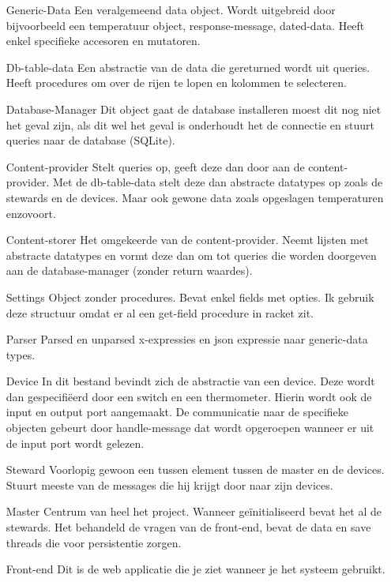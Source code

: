 \documentclass{article}
\begin{document}
\begin{itemize}
\item[Generic-Data] Een veralgemeend data object. Wordt uitgebreid door bijvoorbeeld een temperatuur object, response-message, dated-data. Heeft enkel specifieke accesoren en mutatoren.
\item[Db-table-data] Een abstractie van de data die gereturned wordt uit queries. Heeft procedures om over de rijen te lopen en kolommen te selecteren.
\item[Database-Manager] Dit object gaat de database installeren moest dit nog niet het geval zijn, als dit wel het geval is onderhoudt het de connectie en stuurt queries naar de database (SQLite).
\item[Content-provider] Stelt queries op, geeft deze dan door aan de content-provider. Met de db-table-data stelt deze dan abstracte datatypes op zoals de stewards en de devices. Maar ook gewone data zoals opgeslagen temperaturen enzovoort.
\item[Content-storer] Het omgekeerde van de content-provider. Neemt lijsten met abstracte datatypes en vormt deze dan om tot queries die worden doorgeven aan de database-manager (zonder return waardes).
\item[Settings] Object zonder procedures. Bevat enkel fields met opties. Ik gebruik deze structuur omdat er al een get-field procedure in racket zit.
\item[Parser] Parsed en unparsed x-expressies en json expressie naar generic-data types.
\item[Device] In dit bestand bevindt zich de abstractie van een device. Deze wordt dan gespecifi\"{e}erd door een switch en een thermometer. Hierin wordt ook de input en output port aangemaakt. De communicatie naar de specifieke objecten gebeurt door handle-message dat wordt opgeroepen wanneer er uit de input port wordt gelezen.
\item[Steward] Voorlopig gewoon een tussen element tussen de master en de devices. Stuurt meeste van de messages die hij krijgt door naar zijn devices.
\item[Master] Centrum van heel het project. Wanneer ge\"{i}nitialiseerd bevat het al de stewards. Het behandeld de vragen van de front-end, bevat de data en save threads die voor persistentie zorgen.
\item[Front-end] Dit is de web applicatie die je ziet wanneer je het systeem gebruikt.
\end{itemize}
\end{document}
